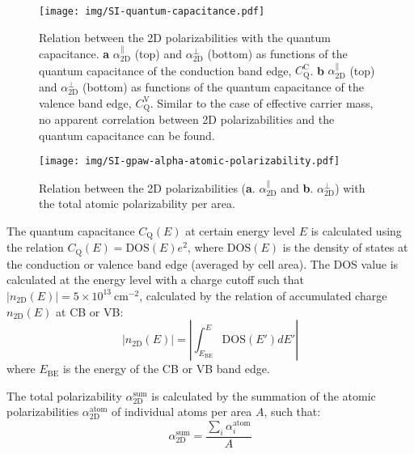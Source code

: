 \documentclass[manuscript=suppinfo,email=true,hyperref=true,keywords=false]{achemso}
\begin{document}
\begin{figure}[htbp]
  \centering
  \texttt{[image: img/SI-quantum-capacitance.pdf]}
  \caption{Relation between the 2D polarizabilities with the quantum
    capacitance. \textbf{a} $\alpha_{\mathrm{2D}}^{\parallel}$ (top) and
    $\alpha_{\mathrm{2D}}^{\perp}$ (bottom) as functions of the quantum capacitance
    of the conduction band edge,
    $C_{\mathrm{Q}}^{\mathrm{C}}$. \textbf{b} $\alpha_{\mathrm{2D}}^{\parallel}$
    (top) and $\alpha_{\mathrm{2D}}^{\perp}$ (bottom) as functions of the quantum
    capacitance of the valence band edge,
    $C_{\mathrm{Q}}^{\mathrm{V}}$. Similar to the case of effective
    carrier mass, no apparent correlation between 2D polarizabilities
    and the quantum capacitance can be found.}
  \label{fig:gpaw-2D-quantities-2}
\end{figure}

\begin{figure}[htbp]
  \centering
  \texttt{[image: img/SI-gpaw-alpha-atomic-polarizability.pdf]}
  \caption{Relation between the 2D polarizabilities
    (\textbf{a}. $\alpha_{\mathrm{2D}}^{\parallel}$ and
    \textbf{b}. $\alpha_{\mathrm{2D}}^{\perp}$) with the total atomic polarizability per area.}
  \label{fig:gpaw-2D-quantities-3}
\end{figure}

The quantum capacitance
$C_{\mathrm{Q}}(E)$ at certain energy level $E$ is calculated using
the relation $C_{\mathrm{Q}}(E)=\mathrm{DOS}(E)e^{2}$, where
$\mathrm{DOS}(E)$ is the density of states at the conduction or valence band edge (averaged by cell
area). The DOS value is calculated at the energy level with a charge
cutoff such that
$|n_{\mathrm{2D}}(E)| = 5 \times 10^{13}\ \mathrm{cm}^{-2}$, calculated by
the relation of accumulated charge $n_{\mathrm{2D}}(E)$ at CB or VB:
\begin{equation}
  \label{eq:CQ-method}
  |n_{\mathrm{2D}}(E)| = \left|\int_{E_{\mathrm{BE}}}^{E} \mathrm{DOS}(E') dE' \right|
\end{equation}
where $E_{\mathrm{BE}}$ is the energy of the CB or VB band edge.

The total polarizability $\alpha_{\mathrm{2D}}^{\mathrm{sum}}$ is calculated by the
summation of the atomic polarizabilities $\alpha_{\mathrm{2D}}^{\mathrm{atom}}$
\cite{Gould_2016_jctc} of individual atoms per area $A$, such that:
\begin{equation}
  \label{eq:atom-polar}
  \alpha_{\mathrm{2D}}^{\mathrm{sum}} = \frac{\sum_{i} \alpha^{\mathrm{atom}}_{i}}{A}
\end{equation}
\end{document}
